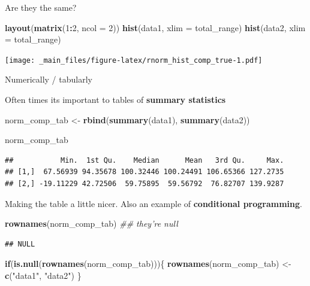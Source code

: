 \documentclass[
]{book}
\newenvironment{Shaded}{\begin{snugshade}}{\end{snugshade}}
\newcommand{\CommentTok}[1]{\textcolor[rgb]{0.56,0.35,0.01}{\textit{#1}}}
\newcommand{\ControlFlowTok}[1]{\textcolor[rgb]{0.13,0.29,0.53}{\textbf{#1}}}
\newcommand{\DataTypeTok}[1]{\textcolor[rgb]{0.13,0.29,0.53}{#1}}
\newcommand{\DecValTok}[1]{\textcolor[rgb]{0.00,0.00,0.81}{#1}}
\newcommand{\KeywordTok}[1]{\textcolor[rgb]{0.13,0.29,0.53}{\textbf{#1}}}
\newcommand{\NormalTok}[1]{#1}
\newcommand{\OperatorTok}[1]{\textcolor[rgb]{0.81,0.36,0.00}{\textbf{#1}}}
\newcommand{\StringTok}[1]{\textcolor[rgb]{0.31,0.60,0.02}{#1}}
\begin{document}
Are they the same?

\begin{Shaded}
\begin{Highlighting}[]
\KeywordTok{layout}\NormalTok{(}\KeywordTok{matrix}\NormalTok{(}\DecValTok{1}\OperatorTok{:}\DecValTok{2}\NormalTok{, }\DataTypeTok{ncol =} \DecValTok{2}\NormalTok{))}
\KeywordTok{hist}\NormalTok{(data1, }\DataTypeTok{xlim =}\NormalTok{ total_range)}
\KeywordTok{hist}\NormalTok{(data2, }\DataTypeTok{xlim =}\NormalTok{ total_range)}
\end{Highlighting}
\end{Shaded}

\texttt{[image: \_main\_files/figure-latex/rnorm\_hist\_comp\_true-1.pdf]}

Numerically / tabularly

Often times its important to tables of \textbf{summary statistics}

\begin{Shaded}
\begin{Highlighting}[]
\NormalTok{norm_comp_tab <-}\StringTok{ }\KeywordTok{rbind}\NormalTok{(}\KeywordTok{summary}\NormalTok{(data1),}
                       \KeywordTok{summary}\NormalTok{(data2))}

\NormalTok{norm_comp_tab}
\end{Highlighting}
\end{Shaded}

\begin{verbatim}
##           Min.  1st Qu.    Median      Mean   3rd Qu.     Max.
## [1,]  67.56939 94.35678 100.32446 100.24491 106.65366 127.2735
## [2,] -19.11229 42.72506  59.75895  59.56792  76.82707 139.9287
\end{verbatim}

Making the table a little nicer. Also an example of \textbf{conditional programming}.

\begin{Shaded}
\begin{Highlighting}[]
\KeywordTok{rownames}\NormalTok{(norm_comp_tab) }\CommentTok{## they're null}
\end{Highlighting}
\end{Shaded}

\begin{verbatim}
## NULL
\end{verbatim}

\begin{Shaded}
\begin{Highlighting}[]
\ControlFlowTok{if}\NormalTok{(}\KeywordTok{is.null}\NormalTok{(}\KeywordTok{rownames}\NormalTok{(norm_comp_tab)))\{}
  \KeywordTok{rownames}\NormalTok{(norm_comp_tab) <-}\StringTok{ }\KeywordTok{c}\NormalTok{(}\StringTok{"data1"}\NormalTok{, }\StringTok{"data2"}\NormalTok{)}
\NormalTok{\}}
\end{Highlighting}
\end{Shaded}
\end{document}
